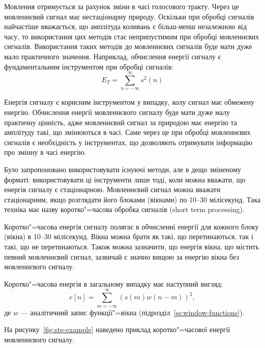     Мовлення отримується за рахунок зміни в часі голосового тракту.
    Через це мовленнєвий сигнал має нестаціонарну природу.
    Оскільки при обробці сигналів найчастіше вважається, що амплітуда коливань є більш-менш незалежною від часу, то
    використання цих методів стає неприпустимим при обробці мовленнєвих сигналів.
    Використання таких методів до мовленнєвих сигналів буде мати дуже мало практичного значення.
    Наприклад, обчислення енергії сигналу є фундаментальним інструментом при обробці сигналів:
    \begin{equation}
        E_T = \sum\limits_{n = {-\infty}}^\infty{s^2\left(n\right)}
    \end{equation}

    Енергія сигналу є корисним інструментом у випадку, колу сигнал має обмежену енергію.
    Обчислення енергії мовленнєвого сигналу буде мати дуже малу практичну цінність, адже мовленнєвий сигнал за
    природою має енергію та амплітуду такі, що змінюються в часі.
    Саме через це при обробці мовленнєвих сигналів є необхідність у інструментах, що дозволяють отримувати інформацію
    про змінну в часі енергію.

    Було запропоновано використовувати існуючі методи, але в дещо зміненому форматі: використовувати ці інструменти
    лише тоді, коли можна вважати, що енергія сигналу є стаціонарною.
    Мовленнєвий сигнал можна вважати стаціонарним, якщо розглядати його блоками (вікнами) по 10--30 мілісекунд.
    Така техніка має назву коротко"=часова обробка сигналів (short term processing).

    Коротко"=часова енергія сигналу полягає в обчисленні енергії для кожного блоку (вікна) в 10--30 мілісекунд.
    Вікна можна брати як такі, що перетинаються, так і такі, що не перетинаються.
    Також можна зазначити, що енергія вікна, що містить певний мовленнєвий сигнал, зазвичай є значно вищою за енергію
    вікна без мовленнєвого сигналу.

    Коротко"=часова енергія в загальному випадку має наступний вигляд:
    \begin{equation}
        e[ n ] = \sum\limits_{m=-\infty}^\infty\left(s\left(m\right) w\left(n - m\right)\right)^2,
    \end{equation}
    де $w$ --- аналітичний запис функції"=вікна (підрозділ~\ref{ss:window-functions}).

    На рисунку~\ref{fig:ste-example} наведено приклад коротко"=часової енергії мовленнєвого сигналу.


